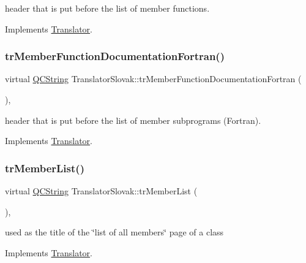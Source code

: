 header that is put before the list of member functions. 

Implements \mbox{\hyperlink{class_translator}{Translator}}.

\mbox{\label{class_translator_slovak_a1a0bf2a9edb72edfd79a3ea62fe63207}} 
\subsubsection{\texorpdfstring{trMemberFunctionDocumentationFortran()}{trMemberFunctionDocumentationFortran()}}
{\footnotesize\ttfamily virtual \mbox{\hyperlink{class_q_c_string}{Q\+C\+String}} Translator\+Slovak\+::tr\+Member\+Function\+Documentation\+Fortran (\begin{DoxyParamCaption}{ }\end{DoxyParamCaption})\hspace{0.3cm}{\ttfamily [inline]}, {\ttfamily [virtual]}}

header that is put before the list of member subprograms (Fortran). 

Implements \mbox{\hyperlink{class_translator}{Translator}}.

\mbox{\label{class_translator_slovak_a6c59f5a71fc32a6cab2abab998a79c47}} 
\subsubsection{\texorpdfstring{trMemberList()}{trMemberList()}}
{\footnotesize\ttfamily virtual \mbox{\hyperlink{class_q_c_string}{Q\+C\+String}} Translator\+Slovak\+::tr\+Member\+List (\begin{DoxyParamCaption}{ }\end{DoxyParamCaption})\hspace{0.3cm}{\ttfamily [inline]}, {\ttfamily [virtual]}}

used as the title of the \char`\"{}list of all members\char`\"{} page of a class 

Implements \mbox{\hyperlink{class_translator}{Translator}}.

